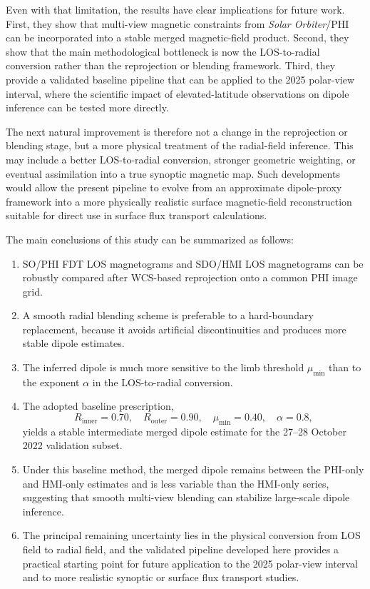\documentclass[namedreferences,hyperref,optionalrh]{spr-sola}
\begin{document}
Even with that limitation, the results have clear implications for future work. First, they show that multi-view magnetic constraints from \textit{Solar Orbiter}/PHI can be incorporated into a stable merged magnetic-field product. Second, they show that the main methodological bottleneck is now the LOS-to-radial conversion rather than the reprojection or blending framework. Third, they provide a validated baseline pipeline that can be applied to the 2025 polar-view interval, where the scientific impact of elevated-latitude observations on dipole inference can be tested more directly.

The next natural improvement is therefore not a change in the reprojection or blending stage, but a more physical treatment of the radial-field inference. This may include a better LOS-to-radial conversion, stronger geometric weighting, or eventual assimilation into a true synoptic magnetic map. Such developments would allow the present pipeline to evolve from an approximate dipole-proxy framework into a more physically realistic surface magnetic-field reconstruction suitable for direct use in surface flux transport calculations.

The main conclusions of this study can be summarized as follows:
\begin{enumerate}
    \item SO/PHI FDT LOS magnetograms and SDO/HMI LOS magnetograms can be robustly compared after WCS-based reprojection onto a common PHI image grid.
    \item A smooth radial blending scheme is preferable to a hard-boundary replacement, because it avoids artificial discontinuities and produces more stable dipole estimates.
    \item The inferred dipole is much more sensitive to the limb threshold $\mu_{\min}$ than to the exponent $\alpha$ in the LOS-to-radial conversion.
    \item The adopted baseline prescription,
    \[
    R_{\mathrm{inner}}=0.70,\quad
    R_{\mathrm{outer}}=0.90,\quad
    \mu_{\min}=0.40,\quad
    \alpha=0.8,
    \]
    yields a stable intermediate merged dipole estimate for the 27--28 October 2022 validation subset.
    \item Under this baseline method, the merged dipole remains between the PHI-only and HMI-only estimates and is less variable than the HMI-only series, suggesting that smooth multi-view blending can stabilize large-scale dipole inference.
    \item The principal remaining uncertainty lies in the physical conversion from LOS field to radial field, and the validated pipeline developed here provides a practical starting point for future application to the 2025 polar-view interval and to more realistic synoptic or surface flux transport studies.
\end{enumerate}
\end{document}
